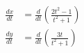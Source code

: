 \documentclass[preview]{standalone}
\begin{document}
\begin{align*}
\frac{dx}{dt} &= \frac{d}{dt} \left(\frac{2t^2 - 1}{t^2 + 1}\right) \\ \frac{dy}{dt} &= \frac{d}{dt} \left(\frac{3t}{t^2+1}\right)
\end{align*}
\end{document}
